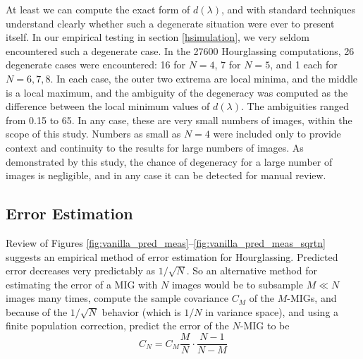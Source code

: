 \documentclass[10pt]{amsart}
\begin{document}

At least we can compute the exact form of $d(\lambda)$, and with standard
techniques understand clearly whether such a degenerate situation were ever to
present itself. In our empirical testing in section \ref{hsimulation}, we very
seldom encountered such a degenerate case. In the 27600 Hourglassing
computations, 26 degenerate cases were encountered: 16 for $N=4$, 7 for $N=5$,
and 1 each for $N=6,7,8$. In each case, the outer two extrema are local minima,
and the middle is a local maximum, and the ambiguity of the degeneracy was
computed as the difference between the local minimum values of $d(\lambda)$. The
ambiguities ranged from 0.15 to 65. In any case, these are very small numbers of
images, within the scope of this study. Numbers as small as $N=4$ were included
only to provide context and continuity to the results for large numbers of
images. As demonstrated by this study, the chance of degeneracy for a large
number of images is negligible, and in any case it can be detected for manual
review.


\subsection{Error Estimation}
Review of Figures \ref{fig:vanilla_pred_meas}--\ref{fig:vanilla_pred_meas_sqrtn}
suggests an empirical meth\-od of error estimation for Hourglassing. Predicted
error decreases very predictably as $1/\sqrt N$. So an alternative method for
estimating the error of a MIG with $N$ images would be to subsample $M \ll N$
images many times, compute the sample covariance $C_M$ of the $M$-MIGs, and
because of the $1/\sqrt N$ behavior (which is $1/N$ in variance space), and
using a finite population correction, predict the error of the $N$-MIG to
be $$C_N=C_M\frac{M}{N}\cdot\frac{N-1}{N-M}$$
\end{document}
